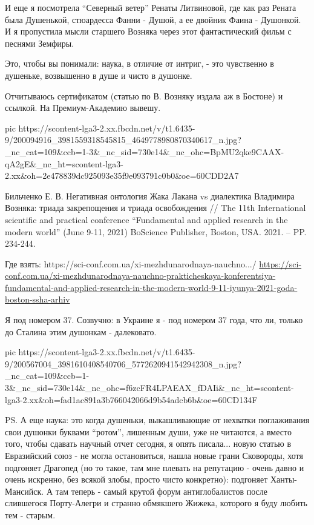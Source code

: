 И еще я посмотрела \enquote{Северный ветер} Ренаты Литвиновой, где как раз
Рената была Душенькой, стюардесса Фанни - Душой, а ее двойник Фаина - Душонкой.
И я пропустила мысли старшего Возняка через этот фантастический фильм с песнями
Земфиры. 

Это, чтобы вы понимали: наука, в отличие от интриг, - это  чувственно в душеньке, возвышенно в душе и чисто в душонке. 

Отчитываюсь сертификатом (статью по В. Возняку издала аж в Бостоне) и ссылкой. На Премиум-Академию вывешу. 

\ifcmt
  pic https://scontent-lga3-2.xx.fbcdn.net/v/t1.6435-9/200094916_3981559318545815_4649778980870340617_n.jpg?_nc_cat=109&ccb=1-3&_nc_sid=730e14&_nc_ohc=BpMU2qke9CAAX-qA2gE&_nc_ht=scontent-lga3-2.xx&oh=2e478839dc925093e35f9e093791c0b0&oe=60CDD2A7
\fi

Бильченко Е. В. Негативная онтология Жака Лакана vs диалектика Владимира
Возняка: триада закрепощения и триада освобождения // The 11th International
scientific and practical conference \enquote{Fundamental and applied research
in the modern world} (June 9-11, 2021) BoScience Publisher, Boston, USA. 2021.
– PP.  234-244.

Где взять: https://sci-conf.com.ua/xi-mezhdunarodnaya-nauchno.../
\url{https://sci-conf.com.ua/xi-mezhdunarodnaya-nauchno-prakticheskaya-konferentsiya-fundamental-and-applied-research-in-the-modern-world-9-11-iyunya-2021-goda-boston-ssha-arhiv}

Я под номером 37. Созвучно: в Украине я - под номером 37 года, что ли, только
до Сталина этим душонкам - далековато.

\ifcmt
  pic https://scontent-lga3-2.xx.fbcdn.net/v/t1.6435-9/200567004_3981610408540706_5772620941542942308_n.jpg?_nc_cat=109&ccb=1-3&_nc_sid=730e14&_nc_ohc=f6zcFR4LPAEAX_fDAIi&_nc_ht=scontent-lga3-2.xx&oh=fad1ac891a3b766042066d9b54adcb6b&oe=60CD134F
\fi

PS. А еще наука: это когда душеньки, выкашливающие от нехватки поглаживания
свои душонки буквами \enquote{ротом}, лишенным души, уже не читаются, а вместо
того, чтобы сдавать научный отчет сегодня, я опять писала... новую статью в
Евразийский союз - не могла остановиться, нашла новые грани Сковороды, хотя
подгоняет Драгопед (но то такое, там мне плевать на репутацию - очень давно и
очень искренно, без всякой злобы, просто чисто конкретно): подгоняет
Ханты-Мансийск. А там теперь - самый крутой форум антиглобалистов после
слившегося Порту-Алегри  и странно обмякшего Жижека, которого я буду любить тем
- старым.
